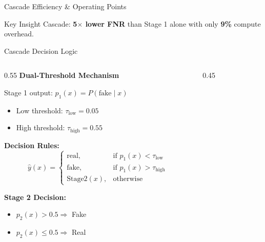 \documentclass[aspectratio=169,12pt]{beamer}
\newcommand{\highlight}[1]{\textcolor{primaryblue}{\textbf{#1}}}
\newcommand{\successtext}[1]{\textcolor{successgreen}{\textbf{#1}}}
\begin{document}
\begin{frame}{Cascade Efficiency \& Operating Points}
\vspace{0.05em}
\begin{block}{\footnotesize Key Insight}
\footnotesize Cascade: \successtext{5$\times$ lower FNR} than Stage 1 alone \quad with only \highlight{9\%} compute overhead.
\end{block}
\end{frame}

\begin{frame}{Cascade Decision Logic}
\begin{columns}[T]
\begin{column}{0.55\textwidth}
\textbf{Dual-Threshold Mechanism}

Stage 1 output: $p_1(x) = P(\text{fake} \mid x)$

\begin{itemize}
    \item Low threshold: $\tau_{\text{low}} = 0.05$
    \item High threshold: $\tau_{\text{high}} = 0.55$
\end{itemize}

\textbf{Decision Rules:}
\[
\hat{y}(x) = \begin{cases}
\text{real}, & \text{if } p_1(x) < \tau_{\text{low}} \\
\text{fake}, & \text{if } p_1(x) > \tau_{\text{high}} \\
\text{Stage2}(x), & \text{otherwise}
\end{cases}
\]

\textbf{Stage 2 Decision:}
\begin{itemize}
    \item $p_2(x) > 0.5 \Rightarrow$ Fake
    \item $p_2(x) \leq 0.5 \Rightarrow$ Real
\end{itemize}
\end{column}

\begin{column}{0.45\textwidth}
\end{column}
\end{columns}
\end{frame}
\end{document}
